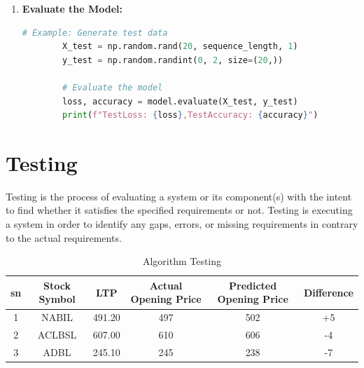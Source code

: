 \documentclass[./main.tex]{subfiles}
\begin{document}
\begin{enumerate}
    \item \textbf{Evaluate the Model:}
        \begin{lstlisting}[frame=single, language=python]
        # Example: Generate test data
        X_test = np.random.rand(20, sequence_length, 1)
        y_test = np.random.randint(0, 2, size=(20,))

        # Evaluate the model
        loss, accuracy = model.evaluate(X_test, y_test)
        print(f"TestLoss: {loss},TestAccuracy: {accuracy}")
        \end{lstlisting}
\end{enumerate}


\section{Testing}
Testing is the process of evaluating a system or its component(s) with the intent to find whether it satisfies the specified requirements or not. Testing is executing a system in order to identify any gaps, errors, or missing requirements in contrary to the actual requirements. 
\begin{center}
\begin{table}[H]
  \caption{Algorithm Testing}
  \begin{tabular}{|c|c|c|c|c|c|}
    \hline
    \textbf{sn} & \textbf{Stock Symbol} &\textbf{LTP} & \textbf{Actual Opening Price} & \textbf{Predicted Opening Price} & \textbf{Difference}  \\
    \hline
    1 & NABIL & 491.20 & 497 & 502 & +5\\
    2 & ACLBSL & 607.00 & 610 & 606 & -4  \\
    3 & ADBL & 245.10 & 245 & 238 & -7\\
    \hline
  \end{tabular}
\end{table}
\end{center}
\end{document}
